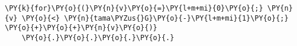 \begin{Verbatim}[commandchars=\\\{\}]
\PY{k}{for}\PY{o}{(}\PY{n}{v}\PY{o}{=}\PY{l+m+mi}{0}\PY{o}{;} \PY{n}{v} \PY{o}{<} \PY{n}{tama\PYZus{}G}\PY{o}{-}\PY{l+m+mi}{1}\PY{o}{;} \PY{o}{+}\PY{o}{+}\PY{n}{v}\PY{o}{)}
    \PY{o}{.}\PY{o}{.}\PY{o}{.}\PY{o}{.}
\end{Verbatim}
